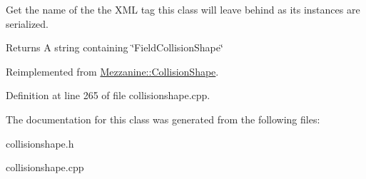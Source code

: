 Get the name of the the XML tag this class will leave behind as its instances are serialized. 

\begin{DoxyReturn}{Returns}
A string containing \char`\"{}FieldCollisionShape\char`\"{} 
\end{DoxyReturn}


Reimplemented from \hyperlink{classMezzanine_1_1CollisionShape_ae5a97a76b687d450f17d0ac86b227f1d}{Mezzanine::CollisionShape}.



Definition at line 265 of file collisionshape.cpp.



The documentation for this class was generated from the following files:\begin{DoxyCompactItemize}
\item 
collisionshape.h\item 
collisionshape.cpp\end{DoxyCompactItemize}
